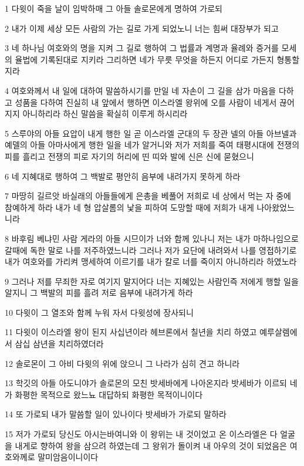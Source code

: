\par 1 다윗이 죽을 날이 임박하매 그 아들 솔로몬에게 명하여 가로되
\par 2 내가 이제 세상 모든 사람의 가는 길로 가게 되었노니 너는 힘써 대장부가 되고
\par 3 네 하나님 여호와의 명을 지켜 그 길로 행하여 그 법률과 계명과 율례와 증거를 모세의 율법에 기록된대로 지키라 그리하면 네가 무릇 무엇을 하든지 어디로 가든지 형통할지라
\par 4 여호와께서 내 일에 대하여 말씀하시기를 만일 네 자손이 그 길을 삼가 마음을 다하고 성품을 다하여 진실히 내 앞에서 행하면 이스라엘 왕위에 오를 사람이 네게서 끊어지지 아니하리라 하신 말씀을 확실히 이루게 하시리라
\par 5 스루야의 아들 요압이 내게 행한 일 곧 이스라엘 군대의 두 장관 넬의 아들 아브넬과 예델의 아들 아마사에게 행한 일을 네가 알거니와 저가 저희를 죽여 태평시대에 전쟁의 피를 흘리고 전쟁의 피로 자기의 허리에 띤 띠와 발에 신은 신에 묻혔으니
\par 6 네 지혜대로 행하여 그 백발로 평안히 음부에 내려가지 못하게 하라
\par 7 마땅히 길르앗 바실래의 아들들에게 은총을 베풀어 저희로 네 상에서 먹는 자 중에 참예하게 하라 내가 네 형 압살롬의 낯을 피하여 도망할 때에 저희가 내게 나아왔었느니라
\par 8 바후림 베냐민 사람 게라의 아들 시므이가 너와 함께 있나니 저는 내가 마하나임으로 갈때에 독한 말로 나를 저주하였느니라 그러나 저가 요단에 내려와서 나를 영접하기로 내가 여호와를 가리켜 맹세하여 이르기를 내가 칼로 너를 죽이지 아니하리라 하였노라
\par 9 그러나 저를 무죄한 자로 여기지 말지어다 너는 지혜있는 사람인즉 저에게 행할 일을 알지니 그 백발의 피를 흘려 저로 음부에 내려가게 하라
\par 10 다윗이 그 열조와 함께 누워 자서 다윗성에 장사되니
\par 11 다윗이 이스라엘 왕이 된지 사십년이라 헤브론에서 칠년을 치리 하였고 예루살렘에서 삼십 삼년을 치리하였더라
\par 12 솔로몬이 그 아비 다윗의 위에 앉으니 그 나라가 심히 견고 하니라
\par 13 학깃의 아들 아도니야가 솔로몬의 모친 밧세바에게 나아온지라 밧세바가 이르되 네가 화평한 목적으로 왔느뇨 대답하되 화평한 목적이니이다
\par 14 또 가로되 내가 말씀할 일이 있나이다 밧세바가 가로되 말하라
\par 15 저가 가로되 당신도 아시는바여니와 이 왕위는 내 것이었고 온 이스라엘은 다 얼굴을 내게로 향하여 왕을 삼으려 하였는데 그 왕위가 돌이켜 내 아우의 것이 되었음은 여호와께로 말미암음이니이다
